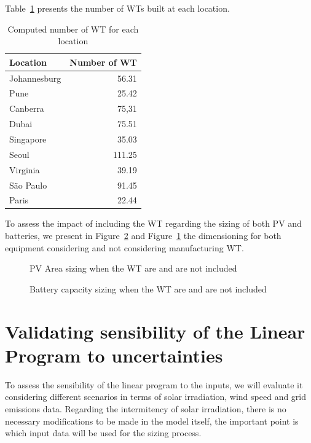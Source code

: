 Table~\ref{tab:results_wt} presents the number of WTs  built at each location.

\begin{table}[H]
  
  \caption{Computed number of WT for each location}\label{tab:results_wt} \centering
  \begin{tabular}{|l|r|}
  \hline
    
  \textbf{Location} &   \textbf{Number of WT} \\
  \hline
  Johannesburg & 56.31   \\
  \hline
  Pune  & 25.42 \\
  \hline
  Canberra  & 75,31 \\
  \hline
  Dubai   &  75.51  \\
  \hline
  Singapore & 35.03  \\
  \hline     
  Seoul    & 111.25  \\
  \hline
  Virginia   & 39.19 \\
  \hline
  São Paulo   & 91.45 \\
  \hline 
  Paris    &    22.44 \\
  \hline
    
\end{tabular}  
\end{table}


To assess the impact of including the WT regarding the sizing of both PV and batteries, we present in Figure~\ref{fig:wind_bat} and Figure~\ref{fig:wind_pv}  the dimensioning for both equipment considering and not considering manufacturing WT. 

\begin{figure}[H]
  \centering
  {}
  \caption{PV Area sizing when the WT are and are not included }
  \label{fig:wind_pv}
\end{figure}


\begin{figure}[H]
  \centering
  {}
  \caption{Battery capacity sizing when the WT are and are not included }
  \label{fig:wind_bat}
\end{figure}

\section{Validating sensibility of the Linear Program to  uncertainties}

To assess the sensibility of the linear program to the inputs, we will evaluate it considering different scenarios in terms of solar irradiation, wind speed and grid emissions data. Regarding the intermitency of solar irradiation, there is no necessary modifications to be made in the model itself, the important point is which input data will be used for the sizing process.

